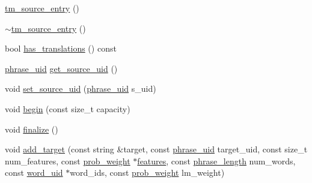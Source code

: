 \begin{DoxyCompactItemize}
\item 
\hyperlink{classuva_1_1smt_1_1bpbd_1_1server_1_1tm_1_1models_1_1tm__source__entry_a2989ee98e0a9a0505cb21259f7dda04b}{tm\+\_\+source\+\_\+entry} ()
\item 
\hyperlink{classuva_1_1smt_1_1bpbd_1_1server_1_1tm_1_1models_1_1tm__source__entry_a9c6a9653a614dc1d06ecea71d5605a1e}{$\sim$tm\+\_\+source\+\_\+entry} ()
\item 
bool \hyperlink{classuva_1_1smt_1_1bpbd_1_1server_1_1tm_1_1models_1_1tm__source__entry_abc7b2b5a3f96ff24a5e546813141c123}{has\+\_\+translations} () const 
\item 
\hyperlink{namespaceuva_1_1smt_1_1bpbd_1_1server_ad18d4cdf5504e76c22b0c124ff60b44f}{phrase\+\_\+uid} \hyperlink{classuva_1_1smt_1_1bpbd_1_1server_1_1tm_1_1models_1_1tm__source__entry_aaa0e8168bcd0f8f889cebb9f41030f52}{get\+\_\+source\+\_\+uid} ()
\item 
void \hyperlink{classuva_1_1smt_1_1bpbd_1_1server_1_1tm_1_1models_1_1tm__source__entry_a95a7e6c78f73a4b8151de898d7df23ce}{set\+\_\+source\+\_\+uid} (\hyperlink{namespaceuva_1_1smt_1_1bpbd_1_1server_ad18d4cdf5504e76c22b0c124ff60b44f}{phrase\+\_\+uid} s\+\_\+uid)
\item 
void \hyperlink{classuva_1_1smt_1_1bpbd_1_1server_1_1tm_1_1models_1_1tm__source__entry_a4f1723b621fb0fb0d90b6a9a57f17887}{begin} (const size\+\_\+t capacity)
\item 
void \hyperlink{classuva_1_1smt_1_1bpbd_1_1server_1_1tm_1_1models_1_1tm__source__entry_a370fd36b585d79ed9c51669d7be2f083}{finalize} ()
\item 
void \hyperlink{classuva_1_1smt_1_1bpbd_1_1server_1_1tm_1_1models_1_1tm__source__entry_a6955e4782b3655323cd2f891b182ae6a}{add\+\_\+target} (const string \&target, const \hyperlink{namespaceuva_1_1smt_1_1bpbd_1_1server_ad18d4cdf5504e76c22b0c124ff60b44f}{phrase\+\_\+uid} target\+\_\+uid, const size\+\_\+t num\+\_\+features, const \hyperlink{namespaceuva_1_1smt_1_1bpbd_1_1server_a01e9ea4de9c226f4464862e84ff0bbcc}{prob\+\_\+weight} $\ast$\hyperlink{feature__tests_8cxx_a1582568e32f689337602a16bf8a5bff0}{features}, const \hyperlink{namespaceuva_1_1smt_1_1bpbd_1_1server_af068a19c2e03116caf3e3827a3e40e35}{phrase\+\_\+length} num\+\_\+words, const \hyperlink{namespaceuva_1_1smt_1_1bpbd_1_1server_a6bfe45ba344d65a7fdd7d26156328ddc}{word\+\_\+uid} $\ast$word\+\_\+ids, const \hyperlink{namespaceuva_1_1smt_1_1bpbd_1_1server_a01e9ea4de9c226f4464862e84ff0bbcc}{prob\+\_\+weight} lm\+\_\+weight)
\item 

\end{DoxyCompactItemize}
